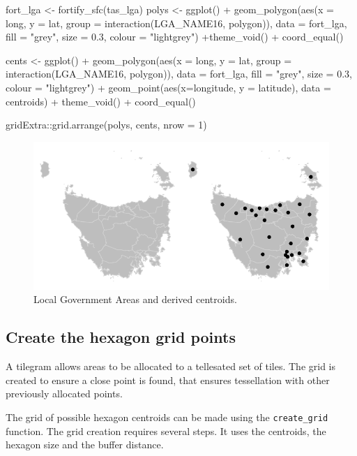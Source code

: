 \begin{Schunk}
\begin{Sinput}
fort_lga <- fortify_sfc(tas_lga)
polys <- ggplot() + 
  geom_polygon(aes(x = long, y = lat, group = interaction(LGA_NAME16, polygon)), data = fort_lga, fill = "grey", size = 0.3, colour = "lightgrey") +theme_void() + coord_equal()

cents <- ggplot() + 
  geom_polygon(aes(x = long, y = lat, group = interaction(LGA_NAME16, polygon)), data = fort_lga, fill = "grey", size = 0.3, colour = "lightgrey") + geom_point(aes(x=longitude, y = latitude), data = centroids) + theme_void() + coord_equal()

gridExtra::grid.arrange(polys, cents, nrow = 1)
\end{Sinput}
\begin{figure}
\includegraphics{algorithmRjournal_files/figure-latex/end_cents-1} \caption[Local Government Areas and derived centroids]{Local Government Areas and derived centroids.}\label{fig:end_cents}
\end{figure}
\end{Schunk}

\hypertarget{create-the-hexagon-grid-points}{%
\subsection{Create the hexagon grid
points}\label{create-the-hexagon-grid-points}}

A tilegram allows areas to be allocated to a tellesated set of tiles.
The grid is created to ensure a close point is found, that ensures
tessellation with other previously allocated points.

The grid of possible hexagon centroids can be made using the
\texttt{create\_grid} function. The grid creation requires several
steps. It uses the centroids, the hexagon size and the buffer distance.

